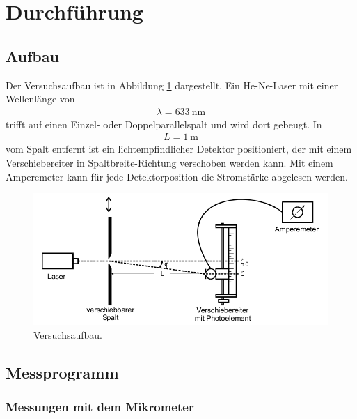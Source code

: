  \section{Durchführung}
\label{sec:Durchführung}

\subsection{Aufbau}

Der Versuchsaufbau ist in Abbildung \ref{fig:aufbau} dargestellt.
Ein He-Ne-Laser mit einer Wellenlänge von
\begin{align}
  \lambda = \SI{633}{\nano\meter}
\end{align}
trifft auf einen Einzel- oder Doppelparallelspalt und wird dort
gebeugt. In
\begin{align}
L = \SI{1}{\meter}
\end{align}
vom Spalt entfernt ist ein
lichtempfindlicher Detektor positioniert, der mit einem Verschiebereiter
in Spaltbreite-Richtung verschoben werden kann.
Mit einem Amperemeter kann für jede Detektorposition die Stromstärke
abgelesen werden.

\begin{figure}
  \centering
  \includegraphics[height=5cm]{MeinePics/Aufbau.png}
  \caption{Versuchsaufbau.\cite{anleitung}}
  \label{fig:aufbau}
\end{figure}

\subsection{Messprogramm}

\subsubsection{Messungen mit dem Mikrometer}

